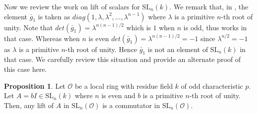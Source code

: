 \documentclass[10pt,twoside]{amsart}
\newcommand{\SL}{\mathrm{SL}}
\theoremstyle{definition}
\theoremstyle{definition}
\newtheorem{proposition}[theorem]{Proposition}
\begin{document}
Now we review the work on lift of scalars for $\SL_n(k)$. We remark that, in \cite[Corollary 3.4]{AvniGelanderKassabovShalev}, the element $\bar g_1$ is taken as $diag(1, \lambda, \lambda^2,\ldots,\lambda^{n-1})$ where $\lambda$ is a primitive $n$-th root of unity. Note that $det(\bar g_1) = \lambda^{n(n-1)/2}$ which is $1$ when $n$ is odd, thus works in that case. Whereas when $n$ is even $det(\bar g_1) = \lambda^{n(n-1)/2} = -1$ since $\lambda^{n/2} = -1$ as $\lambda$ is a primitive $n$-th root of unity. Hence $\bar g_1$ is not an element of $\SL_n(k)$ in that case. We carefully review this situation and provide an alternate proof of this case here. 

\begin{proposition}{\label{lifts of minus I}}
Let $\mathcal{O}$ be a local ring with residue field $k$ of odd characteristic $p$. Let $A = b I\in \SL_n(k)$ where $n$ is even and $b$ is a primitive $n$-th root of unity. Then, any lift of $A$ in $\SL_n(\mathcal{O})$ is a commutator in $\SL_n(\mathcal{O})$. 
\end{proposition}
\end{document}
